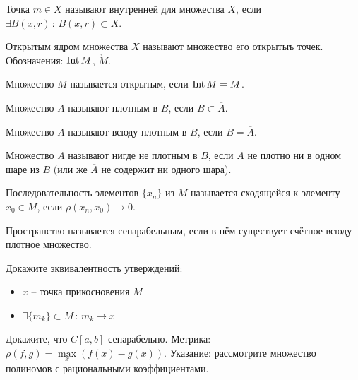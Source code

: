 \begin{Def}
    Точка $m \in X$ называют внутренней для множества $X$, если $\exists B(x, r) \, : \, B(x, r) \subset X$.
\end{Def}

\begin{Def}
    Открытым ядром множества $X$ называют множество его открытыъ точек. Обозначения: $\operatorname{Int} M$, $\mathring{M}$.
\end{Def}

\begin{Def}
    Множество $M$ называется открытым, если $\operatorname{Int} M = M$.
\end{Def}

\begin{Def}
    Множество $A$ называют плотным в $B$, если $B \subset \overline{A}$.
\end{Def}

\begin{Def}
    Множество $A$ называют всюду плотным в $B$, если $B = \overline{A}$.
\end{Def}

\begin{Def}
    Множество $A$ называют нигде не плотным в $B$, если $A$ не плотно ни в одном шаре из $B$ (или же $\overline{A}$ не содержит ни одного шара).
\end{Def}

\begin{Def}
    Последовательность элементов $\{x_n\}$ из \MS $M$ называется сходящейся к элементу $x_0 \in M$, если
    $\rho(x_n, x_0) \rightarrow 0$.
\end{Def}

\begin{Def}
    Пространство называется сепарабельным, если в нём существует счётное всюду плотное множество.
\end{Def}

\begin{Exercise}
    Докажите эквивалентность утверждений:
    \begin{itemize}
        \item $x$ -- точка прикосновения $M$
        \item $\exists \{m_k\} \subset M \, : \, m_k \rightarrow x$
    \end{itemize}
\end{Exercise}

\begin{Exercise}
    Докажите, что $C[a, b]$ сепарабельно. Метрика: $\rho(f, g) = \max\limits_{x} (f(x)-g(x))$. Указание: рассмотрите множество полиномов с рациональными коэффициентами.
\end{Exercise}

